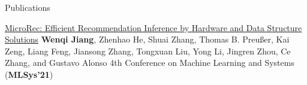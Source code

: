 \begin{rSection}{Publications}
\begin{enumerate}[label={[\arabic*]}]
\item
\begin{Pub}{\href{https://proceedings.mlsys.org/paper_files/paper/2021/hash/9e9a5486cb2f8e44d5b5fedd2a9e5fcd-Abstract.html}{MicroRec: Efficient Recommendation Inference by Hardware and Data Structure Solutions}}
{\textbf{Wenqi Jiang}, Zhenhao He, Shuai Zhang, Thomas B. Preußer, Kai Zeng, Liang Feng, Jiansong Zhang, Tongxuan Liu, Yong Li, Jingren Zhou, Ce Zhang, and Gustavo Alonso}
{4th Conference on Machine Learning and Systems (\textbf{MLSys'21})}
\end{Pub}\end{enumerate}
\end{rSection}
